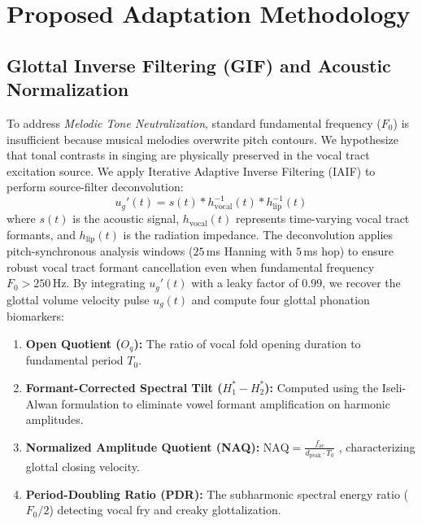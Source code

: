 \section{Proposed Adaptation Methodology}

\subsection{Glottal Inverse Filtering (GIF) and Acoustic Normalization}
To address \textit{Melodic Tone Neutralization}, standard fundamental frequency ($F_0$) is insufficient because musical melodies overwrite pitch contours. We hypothesize that tonal contrasts in singing are physically preserved in the vocal tract excitation source. We apply Iterative Adaptive Inverse Filtering (IAIF) \cite{alku1992glottal,iseli2004f0} to perform source-filter deconvolution:
\begin{equation}
u_g'(t) = s(t) * h_{\text{vocal}}^{-1}(t) * h_{\text{lip}}^{-1}(t)
\end{equation}
where $s(t)$ is the acoustic signal, $h_{\text{vocal}}(t)$ represents time-varying vocal tract formants, and $h_{\text{lip}}(t)$ is the radiation impedance. The deconvolution applies pitch-synchronous analysis windows ($25$\,ms Hanning with $5$\,ms hop) to ensure robust vocal tract formant cancellation even when fundamental frequency $F_0 > 250$\,Hz. By integrating $u_g'(t)$ with a leaky factor of $0.99$, we recover the glottal volume velocity pulse $u_g(t)$ and compute four glottal phonation biomarkers:
\begin{enumerate}
    \item \textbf{Open Quotient ($O_q$):} The ratio of vocal fold opening duration to fundamental period $T_0$.
    \item \textbf{Formant-Corrected Spectral Tilt ($H_1^* - H_2^*$):} Computed using the Iseli-Alwan formulation \cite{iseli2004f0} to eliminate vowel formant amplification on harmonic amplitudes.
    \item \textbf{Normalized Amplitude Quotient (NAQ):} $\text{NAQ} = \frac{f_{\text{ac}}}{d_{\text{peak}} \cdot T_0}$ \cite{alku2002normalized}, characterizing glottal closing velocity.
    \item \textbf{Period-Doubling Ratio (PDR):} The subharmonic spectral energy ratio ($F_0 / 2$) detecting vocal fry and creaky glottalization.
\end{enumerate}

